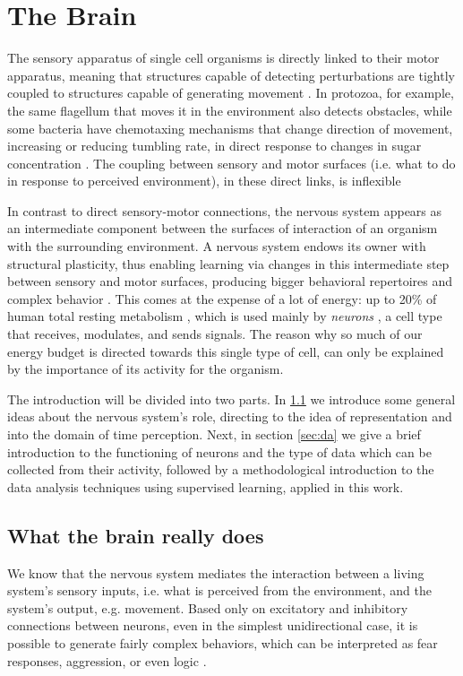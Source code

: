 \chapter{The Brain}
\label{cap:thebrain}

The sensory apparatus of single cell organisms is directly linked to their motor apparatus, meaning that structures capable of detecting perturbations are tightly coupled to structures capable of generating movement \cite[p.~149]{maturana1987tree}. In protozoa, for example, the same flagellum that moves it in the environment also detects obstacles, while some bacteria have chemotaxing mechanisms that change direction of movement, increasing or reducing tumbling rate, in direct response to changes in sugar concentration \cite[p.~147-149]{maturana1987tree}. The coupling between sensory and motor surfaces (i.e. what to do in response to perceived environment), in these direct links, is inflexible %

In contrast to direct sensory-motor connections, the nervous system appears as an intermediate component between the surfaces of interaction of an organism with the surrounding environment. A nervous system endows its owner with structural plasticity, thus enabling learning via changes in this intermediate step between sensory and motor surfaces, producing bigger behavioral repertoires and complex behavior \cite[p.~175]{maturana1987tree}. This comes at the expense of a lot of energy: up to 20\% of human total resting metabolism \cite{attwell2001energy}, which is used mainly by \textit{neurons} \cite{zhu2012quantitative}, a cell type that receives, modulates, and sends signals. The reason why so much of our energy budget is directed towards this single type of cell, can only be explained by the importance of its activity for the organism.

The introduction will be divided into two parts. In \ref{sec:theory} we introduce some general ideas about the nervous system's role, directing to the idea of representation and into the domain of time perception. Next, in section \ref{sec:da} we give a brief introduction to the functioning of neurons and the type of data which can be collected from their activity, followed by a methodological introduction to the data analysis techniques using supervised learning, applied in this work.

\section{What the brain really does}
\label{sec:theory}
    We know that the nervous system mediates the interaction between a living system's sensory inputs, i.e. what is perceived from the environment, and the system's output, e.g. movement. Based only on excitatory and inhibitory connections between neurons, even in the simplest unidirectional case, it is possible to generate fairly complex behaviors, which can be interpreted as fear responses, aggression, or even logic \cite{braitenberg1986vehicles}. %
    
